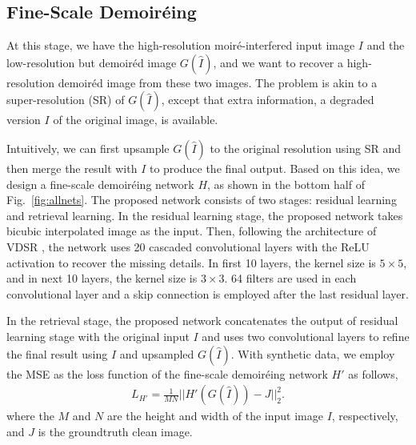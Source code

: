 \documentclass[10pt,twocolumn,letterpaper]{article}
\begin{document}
\subsection{Fine-Scale Demoir\'eing}
\label{sec:superres}

At this stage, we have the high-resolution moir\'e-interfered input
image $I$ and the low-resolution but demoir\'ed image $G(\hat{I})$,
and we want to recover a high-resolution demoir\'ed image from these
two images.  The problem is akin to a super-resolution (SR) of
$G(\hat{I})$, except that extra information, a degraded version $I$ of
the original image, is available.

Intuitively, we can first upsample $G(\hat{I})$ to the original
resolution using SR and then merge the result with $I$ to produce the
final output.  Based on this idea, we design a fine-scale demoir\'eing
network $H$, as shown in the bottom half of Fig.~\ref{fig:allnets}.
The proposed network consists of two stages: residual learning and
retrieval learning.  In the residual learning stage, the proposed
network takes bicubic interpolated image as the input.  Then,
following the architecture of VDSR \cite{kim2016accurate}, the network
uses 20 cascaded convolutional layers with the ReLU activation to
recover the missing details.  In first 10 layers, the kernel size is
$5 \times 5$, and in next 10 layers, the kernel size is $3 \times 3$.
64 filters are used in each convolutional layer and a skip connection
is employed after the last residual layer.

In the retrieval stage, the proposed network concatenates the output
of residual learning stage with the original input $I$ and uses two
convolutional layers to refine the final result using $I$ and
upsampled $G(\hat{I})$.  With synthetic data, we employ the MSE as the
loss function of the fine-scale demoir\'eing network $H'$ as follows,
\begin{align}
  L_{H'} = \frac{1}{MN}||H'(G(\hat{I})) - J||_2^2.
\end{align}
where the $M$ and $N$ are the height and width of the input image $I$,
respectively, and $J$ is the groundtruth clean image.
\end{document}
